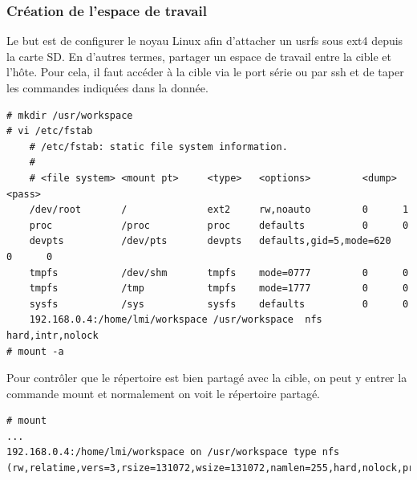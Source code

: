 \subsubsection{Création de l'espace de travail}
Le but est de configurer le noyau Linux afin d’attacher un usrfs sous ext4 depuis la carte SD. En d’autres termes, partager un espace de travail entre la cible et l’hôte. Pour cela, il faut accéder à la cible via le port série ou par ssh et de taper les commandes indiquées dans la donnée.
\begin{lstlisting}
# mkdir /usr/workspace
# vi /etc/fstab
	# /etc/fstab: static file system information.
	#
	# <file system> <mount pt>     <type>   <options>         <dump> <pass>
	/dev/root       /              ext2     rw,noauto         0      1
	proc            /proc          proc     defaults          0      0
	devpts          /dev/pts       devpts   defaults,gid=5,mode=620   0      0
	tmpfs           /dev/shm       tmpfs    mode=0777         0      0
	tmpfs           /tmp           tmpfs    mode=1777         0      0
	sysfs           /sys           sysfs    defaults          0      0
	192.168.0.4:/home/lmi/workspace /usr/workspace  nfs     hard,intr,nolock
# mount -a
\end{lstlisting}
Pour contrôler que le répertoire est bien partagé avec la cible, on peut y entrer la commande mount et normalement on voit le répertoire partagé.
\begin{lstlisting}
# mount
...
192.168.0.4:/home/lmi/workspace on /usr/workspace type nfs (rw,relatime,vers=3,rsize=131072,wsize=131072,namlen=255,hard,nolock,proto=tcp,timeo=600,retrans=2,sec=sys,mountaddr=192.168.0.4,mountvers=3,mountproto=tcp,local_lock=all,addr=192.168.0.4)
\end{lstlisting}
